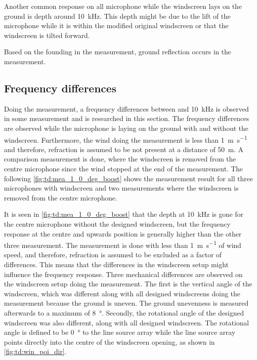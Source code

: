 Another common response on all microphone while the windscreen lays on the ground is depth around \SI{10}{\kilo\hertz}. This depth might be due to the lift of the microphone while it is within the modified original windscreen or that the windscreen is tilted forward.

Based on the founding in the measurement, ground reflection occurs in the measurement.


\subsection{Frequency differences}\label{sec:des:freq_boost}
Doing the measurement, a frequency differences between  and \SI{10}{\kilo\hertz} is observed in some measurement and is researched in this section. The frequency differences are observed while the microphone is laying on the ground with and without the windscreen. Furthermore, the wind doing the measurement is less than \SI{1}{\meter\per\second} and therefore, refraction is assumed to be not present at a distance of \SI{50}{\meter}. A comparison measurement is done, where the windscreen is removed from the centre microphone since the wind stopped at the end of the measurement. The following \autoref{fig:td:mea_1_0_deg_boost} shows the measurement result for all three microphones with windscreen and two measurements where the windscreen is removed from the centre microphone. 


It is seen in \autoref{fig:td:mea_1_0_deg_boost} that the depth at \SI{10}{\kilo\hertz} is gone for the centre microphone without the designed windscreen, but the frequency response at the centre and upwards position is generally higher than the other three measurement. The measurement is done with less than \SI{1}{\meter\per\second} of wind speed, and therefore, refraction is assumed to be excluded as a factor of differences. This means that the differences in the windscreen setup might influence the frequency response. 
Three mechanical differences are observed on the windscreen setup doing the measurement. The first is the vertical angle of the windscreen, which was different along with all designed windscreens doing the measurement because the ground is uneven. The ground unevenness is measured afterwards to a maximum of \SI{8}{\degree}. Secondly, the rotational angle of the designed windscreen was also different, along with all designed windscreen. The rotational angle is defined to be \SI{0}{\degree} to the line source array while the line source array points directly into the centre of the windscreen opening, as shown in \autoref{fig:td:win_poi_dir}.

